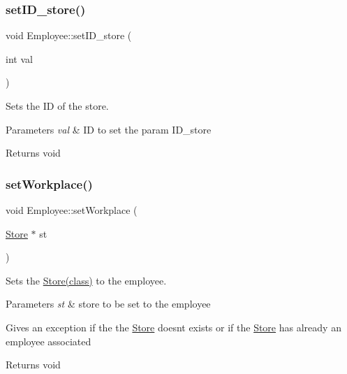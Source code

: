 \subsubsection{\texorpdfstring{set\+I\+D\+\_\+store()}{setID\_store()}}
{\footnotesize\ttfamily void Employee\+::set\+I\+D\+\_\+store (\begin{DoxyParamCaption}\item[{int}]{val }\end{DoxyParamCaption})}



Sets the ID of the store. 


\begin{DoxyParams}{Parameters}
{\em val} & ID to set the param I\+D\+\_\+store\\
\hline
\end{DoxyParams}
\begin{DoxyReturn}{Returns}
void 
\end{DoxyReturn}
\mbox{\label{class_employee_a6c6abc2e287daa04a3135d44f728239c}} 
\subsubsection{\texorpdfstring{set\+Workplace()}{setWorkplace()}}
{\footnotesize\ttfamily void Employee\+::set\+Workplace (\begin{DoxyParamCaption}\item[{\hyperlink{class_store}{Store} $\ast$}]{st }\end{DoxyParamCaption})}



Sets the \hyperlink{class_store}{Store(class)} to the employee. 


\begin{DoxyParams}{Parameters}
{\em st} & store to be set to the employee\\
\hline
\end{DoxyParams}
Gives an exception if the the \hyperlink{class_store}{Store} doesn\textquotesingle{}t exists or if the \hyperlink{class_store}{Store} has already an employee associated

\begin{DoxyReturn}{Returns}
void 
\end{DoxyReturn}
\mbox{\label{class_employee_a86d659298b3c8e66e2529a45ddae211b}} 
